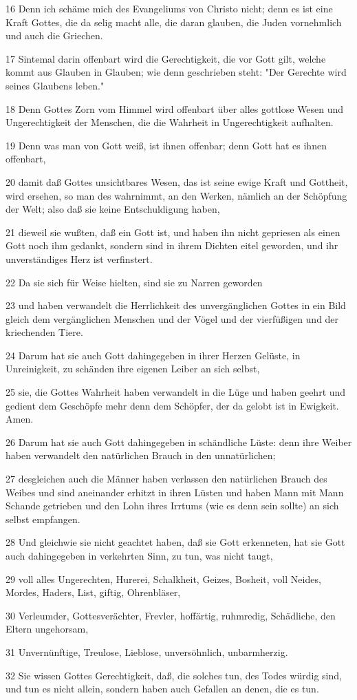 \par 16 Denn ich schäme mich des Evangeliums von Christo nicht; denn es ist eine Kraft Gottes, die da selig macht alle, die daran glauben, die Juden vornehmlich und auch die Griechen.
\par 17 Sintemal darin offenbart wird die Gerechtigkeit, die vor Gott gilt, welche kommt aus Glauben in Glauben; wie denn geschrieben steht: "Der Gerechte wird seines Glaubens leben."
\par 18 Denn Gottes Zorn vom Himmel wird offenbart über alles gottlose Wesen und Ungerechtigkeit der Menschen, die die Wahrheit in Ungerechtigkeit aufhalten.
\par 19 Denn was man von Gott weiß, ist ihnen offenbar; denn Gott hat es ihnen offenbart,
\par 20 damit daß Gottes unsichtbares Wesen, das ist seine ewige Kraft und Gottheit, wird ersehen, so man des wahrnimmt, an den Werken, nämlich an der Schöpfung der Welt; also daß sie keine Entschuldigung haben,
\par 21 dieweil sie wußten, daß ein Gott ist, und haben ihn nicht gepriesen als einen Gott noch ihm gedankt, sondern sind in ihrem Dichten eitel geworden, und ihr unverständiges Herz ist verfinstert.
\par 22 Da sie sich für Weise hielten, sind sie zu Narren geworden
\par 23 und haben verwandelt die Herrlichkeit des unvergänglichen Gottes in ein Bild gleich dem vergänglichen Menschen und der Vögel und der vierfüßigen und der kriechenden Tiere.
\par 24 Darum hat sie auch Gott dahingegeben in ihrer Herzen Gelüste, in Unreinigkeit, zu schänden ihre eigenen Leiber an sich selbst,
\par 25 sie, die Gottes Wahrheit haben verwandelt in die Lüge und haben geehrt und gedient dem Geschöpfe mehr denn dem Schöpfer, der da gelobt ist in Ewigkeit. Amen.
\par 26 Darum hat sie auch Gott dahingegeben in schändliche Lüste: denn ihre Weiber haben verwandelt den natürlichen Brauch in den unnatürlichen;
\par 27 desgleichen auch die Männer haben verlassen den natürlichen Brauch des Weibes und sind aneinander erhitzt in ihren Lüsten und haben Mann mit Mann Schande getrieben und den Lohn ihres Irrtums (wie es denn sein sollte) an sich selbst empfangen.
\par 28 Und gleichwie sie nicht geachtet haben, daß sie Gott erkenneten, hat sie Gott auch dahingegeben in verkehrten Sinn, zu tun, was nicht taugt,
\par 29 voll alles Ungerechten, Hurerei, Schalkheit, Geizes, Bosheit, voll Neides, Mordes, Haders, List, giftig, Ohrenbläser,
\par 30 Verleumder, Gottesverächter, Frevler, hoffärtig, ruhmredig, Schädliche, den Eltern ungehorsam,
\par 31 Unvernünftige, Treulose, Lieblose, unversöhnlich, unbarmherzig.
\par 32 Sie wissen Gottes Gerechtigkeit, daß, die solches tun, des Todes würdig sind, und tun es nicht allein, sondern haben auch Gefallen an denen, die es tun.

